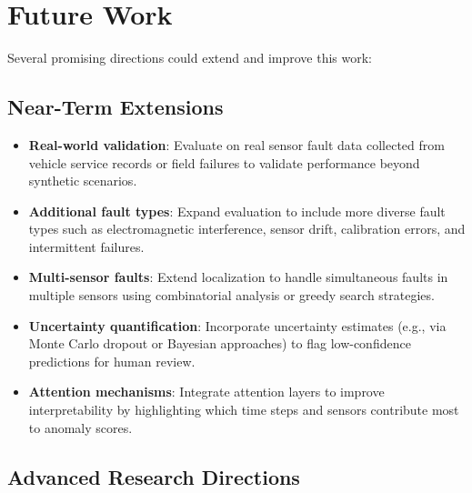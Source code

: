 \section{Future Work}

Several promising directions could extend and improve this work:

\subsection{Near-Term Extensions}

\begin{itemize}
    \item \textbf{Real-world validation}: Evaluate on real sensor fault data collected from vehicle service records or field failures to validate performance beyond synthetic scenarios.

    \item \textbf{Additional fault types}: Expand evaluation to include more diverse fault types such as electromagnetic interference, sensor drift, calibration errors, and intermittent failures.

    \item \textbf{Multi-sensor faults}: Extend localization to handle simultaneous faults in multiple sensors using combinatorial analysis or greedy search strategies.

    \item \textbf{Uncertainty quantification}: Incorporate uncertainty estimates (e.g., via Monte Carlo dropout or Bayesian approaches) to flag low-confidence predictions for human review.

    \item \textbf{Attention mechanisms}: Integrate attention layers to improve interpretability by highlighting which time steps and sensors contribute most to anomaly scores.
\end{itemize}

\subsection{Advanced Research Directions}

